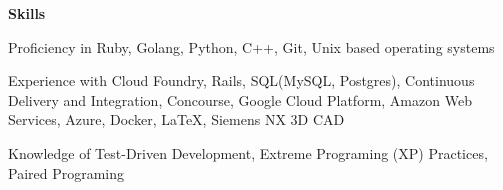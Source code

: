 \documentclass[10pt,a4papaer]{article}
\begin{document}
{	\setlength{\leftskip}{0pt}
	
	{\noindent\textbf{Skills}}\vspace*{-20px}\\
	
	\noindent\makebox[\linewidth]{\rule{\textwidth}{1.2pt}}
	
	Proficiency in Ruby, Golang, Python, C++, Git, Unix based operating systems\\
	
	\setlength{\leftskip}{15pt}
	
	{\noindent Experience with Cloud Foundry, Rails, SQL(MySQL, Postgres), Continuous Delivery and Integration, Concourse, Google Cloud Platform, Amazon Web Services, Azure, Docker, LaTeX, Siemens NX 3D CAD}\\
	
	\setlength{\leftskip}{0pt}
	
	Knowledge of Test-Driven Development, Extreme Programing (XP) Practices, Paired Programing\\
	
}
\end{document}
